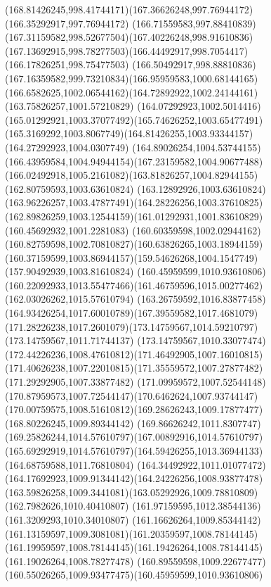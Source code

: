 {    \curveto(168.81426245,998.41744171)(167.36626248,997.76944172)(166.35292917,997.76944172)
    \curveto(166.71559583,997.88410839)(167.31159582,998.52677504)(167.40226248,998.91610836)
    \curveto(167.13692915,998.78277503)(166.44492917,998.7054417)(166.17826251,998.75477503)
    \curveto(166.50492917,998.88810836)(167.16359582,999.73210834)(166.95959583,1000.68144165)
    \curveto(166.6582625,1002.06544162)(164.72892922,1002.24144161)(163.75826257,1001.57210829)
    \curveto(164.07292923,1002.5014416)(165.01292921,1003.37077492)(165.74626252,1003.65477491)
    \curveto(165.3169292,1003.8067749)(164.81426255,1003.93344157)(164.27292923,1004.0307749)
    \curveto(164.89026254,1004.53744155)(166.43959584,1004.94944154)(167.23159582,1004.90677488)
    \curveto(166.02492918,1005.2161082)(163.81826257,1004.82944155)(162.80759593,1003.63610824)
    \curveto(163.12892926,1003.63610824)(163.96226257,1003.47877491)(164.28226256,1003.37610825)
    \curveto(162.89826259,1003.12544159)(161.01292931,1001.83610829)(160.45692932,1001.2281083)
    \curveto(160.60359598,1002.02944162)(160.82759598,1002.70810827)(160.63826265,1003.18944159)
    \curveto(160.37159599,1003.86944157)(159.54626268,1004.1547749)(157.90492939,1003.81610824)
    \moveto(160.45959599,1010.93610806)
    \curveto(160.22092933,1013.55477466)(161.46759596,1015.00277462)(162.03026262,1015.57610794)
    \curveto(163.26759592,1016.83877458)(164.93426254,1017.60010789)(167.39559582,1017.4681079)
    \curveto(171.28226238,1017.2601079)(173.14759567,1014.59210797)(173.14759567,1011.71744137)
    \curveto(173.14759567,1010.33077474)(172.44226236,1008.47610812)(171.46492905,1007.16010815)
    \curveto(171.40626238,1007.22010815)(171.35559572,1007.27877482)(171.29292905,1007.33877482)
    \curveto(171.09959572,1007.52544148)(170.87959573,1007.72544147)(170.6462624,1007.93744147)
    \curveto(170.00759575,1008.51610812)(169.28626243,1009.17877477)(168.80226245,1009.89344142)
    \curveto(169.86626242,1011.8307747)(169.25826244,1014.57610797)(167.00892916,1014.57610797)
    \curveto(165.69292919,1014.57610797)(164.59426255,1013.36944133)(164.68759588,1011.76810804)
    \curveto(164.34492922,1011.01077472)(164.17692923,1009.91344142)(164.24226256,1008.93877478)
    \curveto(163.59826258,1009.3441081)(163.05292926,1009.78810809)(162.7982626,1010.40410807)
    \lineto(161.97159595,1012.38544136)
    \lineto(161.3209293,1010.34010807)
    \curveto(161.16626264,1009.85344142)(161.13159597,1009.3081081)(161.20359597,1008.78144145)
    \curveto(161.19959597,1008.78144145)(161.19426264,1008.78144145)(161.19026264,1008.78277478)
    \curveto(160.89559598,1009.22677477)(160.55026265,1009.93477475)(160.45959599,1010.93610806)
}